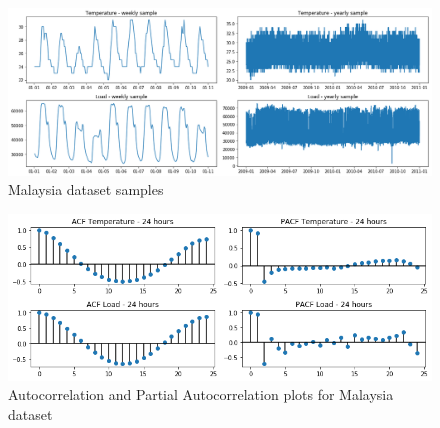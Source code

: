 \begin{figure}[htb]
    \centering
    \includegraphics[width=\textwidth]{figures/dataset_malaysia.png}
    \caption{Malaysia dataset samples}
    \label{fig:malaysia}
\end{figure}

\begin{figure}[htb]
    \centering
    \includegraphics[width=\textwidth]{figures/dataset_malaysia_acf.png}
    \caption{Autocorrelation and Partial Autocorrelation plots for Malaysia dataset}
    \label{fig:malaysia_acf}
\end{figure}

